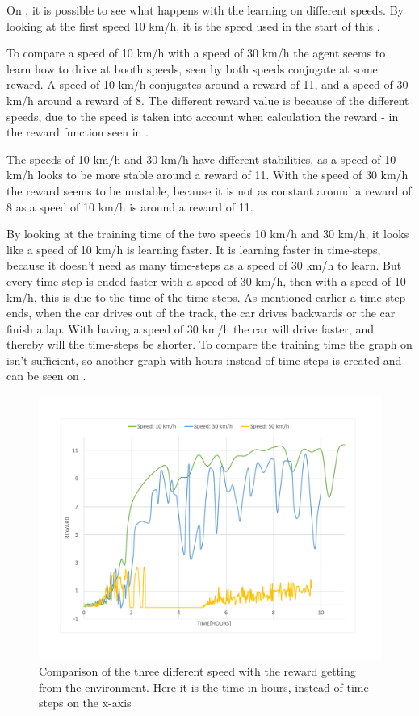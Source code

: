 On , it is possible to see what happens with the learning on different speeds. By looking at the first speed 10 km/h, it is the speed used in the start of this . 

To compare a speed of 10 km/h with a speed of 30 km/h the agent seems to learn how to drive at booth speeds, seen by both speeds conjugate at some reward. A speed of 10 km/h conjugates around a reward of 11, and a speed of 30 km/h around a reward of 8. The different reward value is because of the different speeds, due to the speed is taken into account when calculation the reward - in the reward function seen in . 

The speeds of 10 km/h and 30 km/h have different stabilities, as a speed of 10 km/h looks to be more stable around a reward of 11. With the speed of 30 km/h the reward seems to be unstable, because it is not as constant around a reward of 8 as a speed of 10 km/h is around  a reward of 11.

By looking at the training time of the two speeds 10 km/h and 30 km/h, it looks like a speed of 10 km/h is learning faster. It is learning faster in time-steps, because it doesn't need as many time-steps as a speed of 30 km/h to learn. But every time-step is ended faster with a speed of 30 km/h, then with a speed of 10 km/h, this is due to the time of the time-steps. As mentioned earlier a time-step ends, when the car drives out of the track, the car drives backwards or the car finish a lap. With having a speed of 30 km/h the car will drive faster, and thereby will the time-steps be shorter. To compare the training time the graph on  isn't sufficient, so another graph with hours instead of time-steps is created and can be seen on . 
\begin{figure}[H]
	\centering
	\includegraphics[width=1\textwidth]{Figures/Result/change_of_acceleration_reward_hours_graph.pdf}
	\caption{Comparison of the three different speed with the reward getting from the environment. Here it is the time in hours, instead of time-steps on the x-axis}
	\label{fig:change_of_acceleration_reward_hours_graph}
\end{figure}

